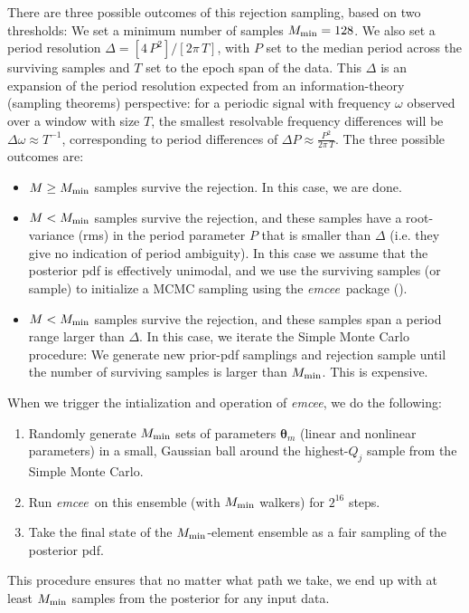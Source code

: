 \documentclass[manuscript, letterpaper]{aastex6}
\newcommand{\project}[1]{\textsl{#1}}
\newcommand{\emcee}{\project{emcee}}
\newcommand{\bs}[1]{\boldsymbol{#1}}
\begin{document}
There are three possible outcomes of this rejection sampling, based on two
thresholds:
We set a minimum number of samples $M_{\rm min}=128$.
We also set a period resolution $\Delta = [4\,P^2] / [2\pi\,T]$, with
$P$ set to the median period across the surviving samples and $T$ set to
the epoch span of the data.
This $\Delta$ is an expansion of the period resolution expected from an
information-theory (sampling theorems) perspective:
for a periodic signal with frequency $\omega$ observed over a window with size
$T$, the smallest resolvable frequency differences will be $\Delta\omega \approx
T^{-1}$, corresponding to period differences of $\Delta P \approx
\frac{P^2}{2\pi\,T}$.
The three possible outcomes are:
\begin{itemize}\itemsep0ex
\item $M\geq M_{\rm min}$ samples survive the rejection.
  In this case, we are done.
\item $M<M_{\rm min}$ samples survive the rejection, and these samples have a
  root-variance (rms) in the period parameter $P$ that is smaller than $\Delta$
  (i.e. they give no indication of period ambiguity).
  In this case we assume that the posterior pdf is effectively unimodal, and we
  use the surviving samples (or sample) to initialize a MCMC sampling using the
  \emcee\ package (\citealt{Foreman-Mackey:2013}).
\item $M<M_{\rm min}$ samples survive the rejection, and these samples
  span a period range larger than $\Delta$.
  In this case, we iterate the Simple Monte Carlo procedure: We generate new
  prior-pdf samplings and rejection sample until the number of surviving samples
  is larger than $M_{\rm min}$.
  This is expensive.
\end{itemize}
When we trigger the intialization and operation of \emcee, we do the following:
\begin{enumerate}\itemsep0ex
\item Randomly generate $M_{\rm min}$ sets of parameters $\bs{\theta}_m$
  (linear and nonlinear parameters) in a small, Gaussian ball around
  the highest-$Q_j$ sample from the Simple Monte Carlo.
\item Run \emcee\ on this ensemble (with $M_{\rm min}$ walkers) for $2^{16}$
  steps.
\item Take the final state of the $M_{\rm min}$-element ensemble as a
  fair sampling of the posterior pdf.
\end{enumerate}
This procedure ensures that no matter what path we take, we end up with
at least $M_{\rm min}$ samples from the posterior for any input data.
\end{document}
